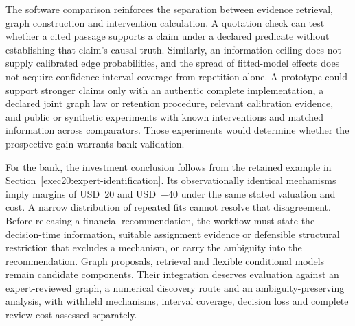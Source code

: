 The software comparison reinforces the separation between evidence retrieval,
graph construction and intervention calculation. A quotation check can test
whether a cited passage supports a claim under a declared predicate without
establishing that claim's causal truth. Similarly, an information ceiling does
not supply calibrated edge probabilities, and the spread of fitted-model
effects does not acquire confidence-interval coverage from repetition alone.
A prototype could support stronger claims only with an authentic complete
implementation, a declared joint graph law or retention procedure, relevant
calibration evidence, and public or synthetic experiments with known
interventions and matched information across comparators. Those experiments
would determine whether the prospective gain warrants bank validation.

For the bank, the investment conclusion follows from the retained example in
Section~\ref{exec20:expert-identification}. Its observationally identical
mechanisms imply margins of USD~20 and USD~$-40$ under the same stated
valuation and cost. A narrow distribution of repeated fits cannot resolve
that disagreement. Before releasing a financial recommendation, the workflow
must state the decision-time information, suitable assignment evidence or
defensible structural restriction that excludes a mechanism, or carry the
ambiguity into the recommendation. Graph proposals, retrieval and flexible
conditional models remain candidate components. Their integration deserves
evaluation against an expert-reviewed graph, a numerical discovery route and
an ambiguity-preserving analysis, with withheld mechanisms, interval coverage,
decision loss and complete review cost assessed separately.
